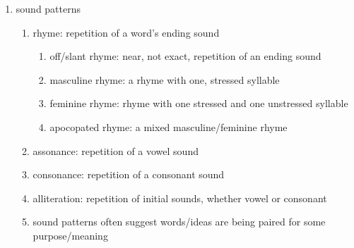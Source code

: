 \documentclass[12pt]{article}
\begin{document}
\begin{enumerate}
\begin{enumerate}
\begin{enumerate}
        \end{enumerate}
    \item a word's stress pattern can be different in a metered line than by itself
    \item other terms
        \begin{enumerate}
        \item line: the basic unit that defines the text's meter (e.g., a line of tetrameter)
        \item caesura: traditionally, a pause within a line that separates two logical parts, without a meter break; also can refer to a break in the meter within a line
        \item enjambment: continuation of a phrase across a line break, such that the meter of each respective line remains unchanged
        \end{enumerate}
    \item in metered works, a break/change/deviation in the meter often suggests something textually significant
    \item iambic pentameter is historically the default meter of English verse
    \end{enumerate}
\item sound patterns
    \begin{enumerate}
    \item rhyme: repetition of a word's ending sound
        \begin{enumerate}
        \item off/slant rhyme: near, not exact, repetition of an ending sound
        \item masculine rhyme: a rhyme with one, stressed syllable
        \item feminine rhyme: rhyme with one stressed and one unstressed syllable
        \item apocopated rhyme: a mixed masculine/feminine rhyme
        \end{enumerate}
    \item assonance: repetition of a vowel sound
    \item consonance: repetition of a consonant sound
    \item alliteration: repetition of initial sounds, whether vowel or consonant
    \item sound patterns often suggest words/ideas are being paired for some purpose/meaning
    \end{enumerate}
\end{enumerate}
\end{document}
